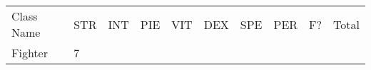 \documentclass[12pt]{article}
\newcommand{\indexClass}[1]{\index{#1}}
\newcommand{\class}[1]{#1\indexClass{#1}}
\begin{document}
\begin{longtable}[]{@{}llllllllll@{}}
\toprule
\begin{minipage}[t]{0.13\columnwidth}\raggedright\strut
Class Name
\strut\end{minipage} &
\begin{minipage}[t]{0.06\columnwidth}\raggedright\strut
STR
\strut\end{minipage} &
\begin{minipage}[t]{0.06\columnwidth}\raggedright\strut
INT
\strut\end{minipage} &
\begin{minipage}[t]{0.06\columnwidth}\raggedright\strut
PIE
\strut\end{minipage} &
\begin{minipage}[t]{0.06\columnwidth}\raggedright\strut
VIT
\strut\end{minipage} &
\begin{minipage}[t]{0.06\columnwidth}\raggedright\strut
DEX
\strut\end{minipage} &
\begin{minipage}[t]{0.06\columnwidth}\raggedright\strut
SPE
\strut\end{minipage} &
\begin{minipage}[t]{0.06\columnwidth}\raggedright\strut
PER
\strut\end{minipage} &
\begin{minipage}[t]{0.07\columnwidth}\raggedright\strut
F?
\strut\end{minipage} &
\begin{minipage}[t]{0.08\columnwidth}\raggedright\strut
Total
\strut\end{minipage}\tabularnewline
\begin{minipage}[t]{0.13\columnwidth}\raggedright\strut
\class{Fighter}
\strut\end{minipage} &
\begin{minipage}[t]{0.06\columnwidth}\raggedright\strut
7
\strut\end{minipage} &
\begin{minipage}[t]{0.06\columnwidth}\raggedright\strut
\strut\end{minipage} &
\begin{minipage}[t]{0.06\columnwidth}\raggedright\strut
\strut\end{minipage} &
\begin{minipage}[t]{0.06\columnwidth}\raggedright\strut
\strut\end{minipage} &
\begin{minipage}[t]{0.06\columnwidth}\raggedright\strut

\end{minipage}
\end{longtable}
\end{document}
